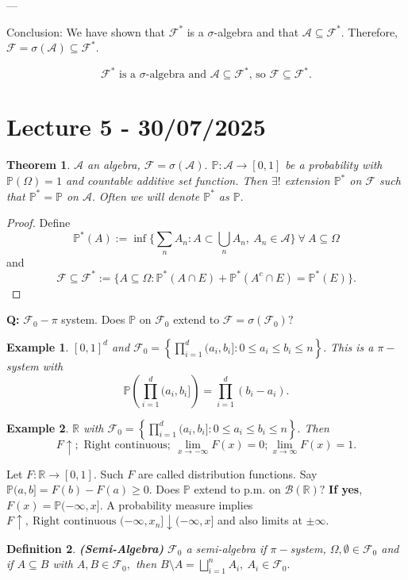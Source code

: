 \documentclass{article}
\newcommand{\1}{\mathds{1}}
\newcommand{\R}{\mathbb{R}}
\newcommand{\F}{\mathcal{F}}
\newcommand{\B}{\mathcal{B}}
\newcommand{\PB}{\mathbb{P}}
\newcommand{\A}{\mathcal{A}}
\newcommand{\lf}{\left}
\newcommand{\rg}{\right}
\newcommand{\sm}{\setminus}
\newtheorem{theorem}{Theorem}[section]
\newtheorem{definition}[theorem]{Definition}
\newtheorem{example}{Example}
\begin{document}
---

       Conclusion:
We have shown that \(\mathcal{F}^*\) is a \(\sigma\)-algebra and that \(\mathcal{A} \subseteq \mathcal{F}^*\). Therefore, \(\mathcal{F} = \sigma(\mathcal{A}) \subseteq \mathcal{F}^*\).

\[
\boxed{\mathcal{F}^*\text{ is a }\sigma\text{-algebra and }\mathcal{A} \subseteq \mathcal{F}^*\text{, so }\mathcal{F} \subseteq \mathcal{F}^*.}
\]

\section{Lecture 5 - 30/07/2025}
\begin{theorem}
    $\A$ an algebra, $\F=\sigma(\A).$ $\PB:\A\to [0,1]$ be a probability with $\PB(\Omega)=1$ and countable additive set function. Then $\exists!$ extension $\PB^*$ on $\F$ such that $\PB^*=\PB$ on $\A.$ Often we will denote $\PB^*$ as $\PB.$
\end{theorem}
\begin{proof}
    Define $$\PB^*(A):=\inf\{\sum_n A_n:A\subset \bigcup_n A_n,\ A_n\in\A\}\ \forall\ A\subseteq\Omega$$ and $$\F\subseteq\F^*:=\{A\subseteq\Omega:\PB^*(A\cap E)+\PB^*(A^c\cap E)=\PB^*(E)\}.$$ 
\end{proof}
\textbf{Q:} $\F_0-\pi$ system. Does $\PB$ on $\F_0$ extend to $\F=\sigma(\F_0)?$ 
\begin{example}
    $[0,1]^d$ and $\F_0=\lf\{\prod_{i=1}^d(a_i,b_i]:0\leq a_i\leq b_i\leq n\rg\}.$ This is a $\pi-$system with $$\PB\lf(\prod_{i=1}^d(a_i,b_i]\rg)=\prod_{i=1}^d(b_i-a_i).$$
\end{example}
\begin{example}
    $\R$ with $\F_0=\lf\{\prod_{i=1}^d(a_i,b_i]:0\leq a_i\leq b_i\leq n\rg\}.$
    Then $$F\uparrow;\text{ Right continuous};\ \lim_{x\to-\infty}F(x)=0;\lim_{x\to\infty}F(x)=1.$$
\end{example}
Let $F:\R\to [0,1].$ Such $F$ are called distribution functions. Say $\PB(a,b]=F(b)-F(a)\geq 0.$\label{pdef1} Does $\PB$ extend to p.m. on $\B(\R)?$ \textbf{If yes}, $F(x)=\PB(-\infty,x].$ A probability measure implies $F\uparrow,\ \text{Right continuous } (-\infty,x_n]\downarrow (-\infty,x]$ and also limits at $\pm\infty.$ 
\begin{definition}\textbf{(Semi-Algebra)}
$\F_0$ a semi-algebra if $\pi-$system, $\Omega,\emptyset\in\F_0$ and if $A\subseteq B$ with $A,B\in\F_0,$ then $B\sm A=\bigsqcup_{i=1}^n A_i,\ A_i\in\F_0.$
\end{definition}
\end{document}
